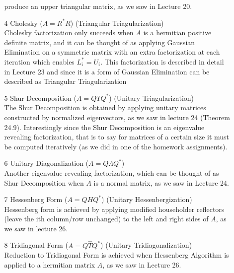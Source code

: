 \documentclass[12pt]{article}
\makeatletter
\theoremstyle{homework}
\newenvironment{exercise}[1]
{\def\@currentlabel{#1}\exercisecore}
{\endexercisecore}
\makeatother
\begin{document}
\begin{exercise}{F1}
\begin{enumerate}
\begin{enumerate}
        produce an upper triangular matrix, as we saw in Lecture 20. 
        \vspace{.15in}
        \item[4] Cholesky ($A = R^*R$) (Triangular Triagularization)\\
        Cholesky factorization only succeeds when $A$ is a hermitian positive definite matrix, and it can be thought of as applying Gaussian Elimination on a symmetric matrix 
        with an extra factorization at each iteration which enables $L^*_i = U_i$. This factorization is described in detail in Lecture 23 and since it is a form of Gaussian Elimination 
        can be described as Triangular Triagularization
        \vspace{.15in}
        \item[5] Shur Decomposition ($A = QTQ^*$) (Unitary Triagularization)\\
        The Shur Decomposition is obtained by applying unitary matrices constructed by normalized eigenvectors, as we saw in lecture 24 (Theorem 24.9).
        Interestingly since the Shur Decomposition is an eigenvalue revealing factorization, that is to say for matrices of a certain size it must be computed iteratively (as we did in one of the homework assignments).
        \vspace{.15in}
        \item[6] Unitary Diagonalization ($A = Q\Lambda Q^*$)\\
        Another eigenvalue revealing factorization, which can be thought of as Shur Decomposition when $A$ is a normal matrix, as we saw in Lecture 24. 
        \vspace{.15in}
        \item[7] Hessenberg Form ($A = QHQ^*$) (Unitary Hessenbergization)\\
         Hessenberg form is achieved by applying modified householder reflectors (leave the ith column/row unchanged) to the left and right sides of $A$, as we saw in lecture 26. 
        \vspace{.15in}
        \item[8] Tridiagonal Form ($A = Q\hat{T}Q^*$) (Unitary Tridiagonalization)\\
        Reduction to Tridiagonal Form is achieved when Hessenberg Algorithm is applied to a hermitian matrix $A$, as we saw in Lecture 26.
      \end{enumerate}
      \vspace{.25in}


\end{enumerate}
\end{exercise}
\end{document}
